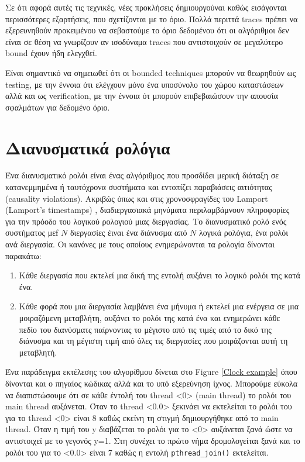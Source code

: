 Σε ότι αφορά αυτές τις τεχνικές, νέες προκλήσεις δημιουργούναι \cite{BPOR} καθώς εισάγονται περισσότερες εξαρτήσεις, που σχετίζονται με το όριο.
Πολλά περιττά traces πρέπει να εξερευνηθούν προκειμένου να σεβαστούμε το όριο δεδομένου ότι οι αλγόριθμοι δεν είναι σε θέση να γνωρίζουν αν ισοδύναμα traces  που αντιστοιχούν 
σε μεγαλύτερο bound έχουν ήδη ελεγχθεί.

Είναι σημαντικό να σημειωθεί ότι οι bounded techniques μπορούν να θεωρηθούν ως testing, με την έννοια ότι ελέγχουν μόνο ένα υποσύνολο του χώρου καταστάσεων αλλά και ως 
verification, με την έννοια ότ μπορούν επιβεβαιώσουν την απουσία σφαλμάτων για δεδομένο όριο.

\section{Διανυσματικά ρολόγια}

Ένα διανυσματικό ρολόι είναι ένας αλγόριθμος που προσδίδει μερική διάταξη σε κατανεμμημένα ή ταυτόχρονα συστήματα και εντοπίζει παραβιάσεις αιτιότητας (causality violations).
Ακριβώς όπως και στις χρονοσφραγίδες του Lamport (Lamport's timestamps) \cite{Lamport@CACM-89}, διαδιεργασιακά μηνύματα περιλαμβάμνουν πληροφορίες για την πρόοδο του λογικού ρολογιού
μιας διεργασίας.
Το διανυσματικό ρολό ενός συστήματος μεf $N$ διεργασίες έιναι ένα διάνυσμα από $N$ λογικά ρολόγια, ένα ρολόι ανά διεργασία.
Οι κανόνες με τους οποίους ενημερώνονται τα ρολογία δίνονται παρακάτω:

\begin{enumerate}
    \item Κάθε διεργασία που εκτελεί μια δική της εντολή αυξάνει το λογικό ρολόι της κατά ένα.
    \item Κάθε φορά που μια διεργασία λαμβάνει ένα μήνυμα ή εκτελεί μια ενέργεια σε μια μοιραζόμενη μεταβλήτη, αυξάνει το ρολόι της κατά ένα και ενημερώνει κάθε πεδίο του διανύσματς παίρνοντας το μέγιστο από τις τιμές από το δικό της διάνυσμα και τη μέγιστη τιμή από όλες τις διεργασίες που μοιράζονται αυτή τη μεταβλητή.
\end{enumerate}

Ένα παράδειγμα εκτέλεσης του αλγορίθμου δίνεται στο Figure \ref{Clock example} όπου δίνονται και ο πηγαίος κώδικας αλλά και το υπό εξερεύνηση ίχνος.
Μπορούμε εύκολα να διαπιστώσουμε ότι σε κάθε έντολή του thread <0> (main thread) το ρολόι του main thread αυξάνεται. Όταν το thread <0.0> ξεκινάει να εκτελείται το ρολόι του για το thread <0> είναι 8 καθώς εκείνη τη στιγμή δημιουργήθηκε από το main thread.
Όταν η τιμή του y διαβάζεται το ρολόι για το <0> αυξάνεται ξανά ώστε να αντιστοιχεί με το γεγονός y=1. Στη συνέχει το πρώτο νήμα δρομολογείται ξανά και το ρολόι του για το <0.0> είναι 7
καθώς η εντολή \verb|pthread_join()| εκτελείται.


